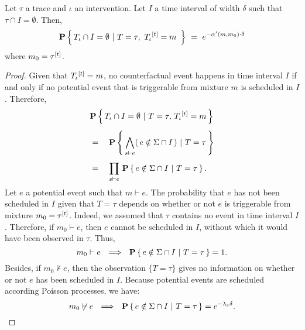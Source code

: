 

\begin{theorem} Let $\tau$ a trace and $\iota$ an intervention. Let
  $I$ a time interval of width $\delta$ such that
  $\tau \cap I = \emptyset$. Then,
  \[\mathbf{P} \left\{\,  {T_\iota}{} \cap I = \emptyset  \ |\  T=\tau,\
      {T_\iota}{}^{[t]} = m\  \,\right\}
    \ =\ e^{-\alpha'(m, m_0) \cdot \delta}
  \]
  where $m_0 = \tau^{[t]}$.
\end{theorem}
\begin{proof}

  Given that ${T_\iota}{}^{[t]} = m$, no counterfactual event
  happens in time interval $I$ if and only if no potential event that
  is triggerable from mixture $m$ is scheduled in $I$. Therefore,
  \vskip 0.0cm
  \begin{equation}\label{eqn:scheduled-decomposition}
    \begin{aligned}
      &\mathbf{P} \left\{\,  {T_\iota}{} \cap I = \emptyset  \ |\  T=\tau,\,
        {T_\iota}{}^{[t]} = m  \,\right\}
      \\[0.4em]
      &= \quad \mathbf{P} \left\{\,  \bigwedge_{s \vdash e} (\,e \notin \Sigma \cap
        I \,)  \ |\  T=\tau  \,\right\}
      \\[0.4em]
      &= \quad \prod_{s \vdash e}\, \mathbf{P} \left\{\, e \notin \Sigma \cap I  \ |\ 
        T=\tau  \,\right\}.
    \end{aligned}
  \end{equation}
  \vskip 0.2cm Let $e$ a potential event such that $m \vdash e$. The
  probability that $e$ has not been scheduled in $I$ given that
  $T=\tau$ depends on whether or not $e$ is triggerable from mixture
  $m_0 = \tau^{[t]}$. Indeed, we assumed that $\tau$ contains no
  event in time interval $I$. Therefore, if $m_0 \vdash e$, then $e$
  cannot be scheduled in $I$, without which it would have been
  observed in $\tau$.  Thus,
  \begin{equation}\label{eqn:pscheduled1}
    m_0 \vdash e \ \ \Longrightarrow\ \ \mathbf{P} \left\{\, e \notin \Sigma \cap I \ |\ T=\tau  \,\right\} = 1.
  \end{equation}
  Besides, if $m_0 \not\vdash e$, then the observation $\{ T=\tau \}$
  gives no information on whether or not $e$ has been scheduled in
  $I$. Because potential events are scheduled according Poisson
  processes, we have:
  \begin{equation}\label{eqn:pscheduled2}
    m_0 \not\vdash e \ \ \Longrightarrow\ \ \mathbf{P} \left\{\, e \notin \Sigma \cap I \ |\ 
      T=\tau  \,\right\} = e^{-\lambda_e \delta}.
  \end{equation}

\end{proof}
